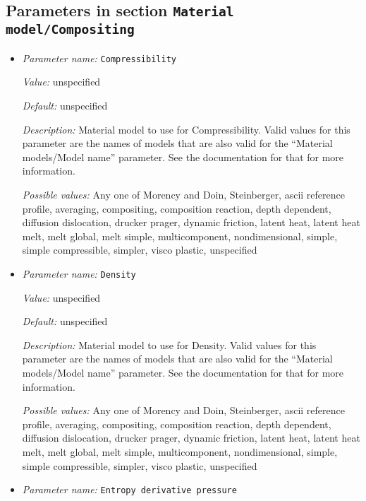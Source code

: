 \subsection{Parameters in section \tt Material model/Compositing}
\label{parameters:Material_20model/Compositing}

\begin{itemize}
\item {\it Parameter name:} {\tt Compressibility}
\label{parameters:Material model/Compositing/Compressibility}


{\it Value:} unspecified


{\it Default:} unspecified


{\it Description:} Material model to use for Compressibility. Valid values for this parameter are the names of models that are also valid for the ``Material models/Model name'' parameter. See the documentation for that for more information.


{\it Possible values:} Any one of Morency and Doin, Steinberger, ascii reference profile, averaging, compositing, composition reaction, depth dependent, diffusion dislocation, drucker prager, dynamic friction, latent heat, latent heat melt, melt global, melt simple, multicomponent, nondimensional, simple, simple compressible, simpler, visco plastic, unspecified
\item {\it Parameter name:} {\tt Density}
\label{parameters:Material model/Compositing/Density}


{\it Value:} unspecified


{\it Default:} unspecified


{\it Description:} Material model to use for Density. Valid values for this parameter are the names of models that are also valid for the ``Material models/Model name'' parameter. See the documentation for that for more information.


{\it Possible values:} Any one of Morency and Doin, Steinberger, ascii reference profile, averaging, compositing, composition reaction, depth dependent, diffusion dislocation, drucker prager, dynamic friction, latent heat, latent heat melt, melt global, melt simple, multicomponent, nondimensional, simple, simple compressible, simpler, visco plastic, unspecified
\item {\it Parameter name:} {\tt Entropy derivative pressure}
\label{parameters:Material model/Compositing/Entropy derivative pressure}



\end{itemize}
